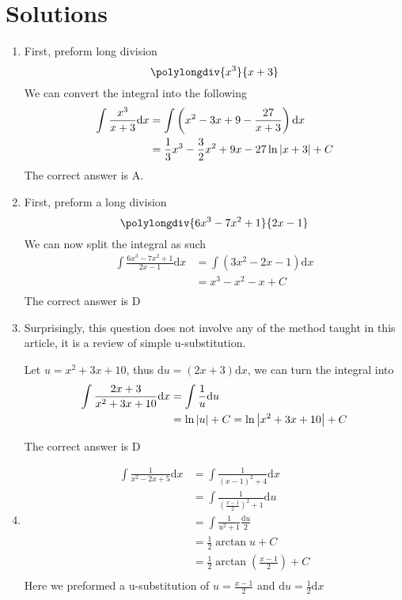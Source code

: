 \documentclass{article}
\numberwithin{equation}{section}
\begin{document}
\section{Solutions}
\begin{enumerate}
    \item First, preform long division
    \[
    \polylongdiv{x^3}{x+3}
    \]
    We can convert the integral into the following
    \begin{align*}
        \int \frac{x^3}{x+3}\mathrm{d}x &= \int \left(x^2 - 3x + 9 - \frac{27}{x+3}\right) \mathrm{d}x\\
        &= \frac{1}{3}x^3 - \frac{3}{2} x^2 + 9x - 27\ln{\abs{x+3}} + C\\
    \end{align*}
    The correct answer is A.
    \item First, preform a long division
    \[
    \polylongdiv{6x^3-7x^2+1}{2x-1}
    \]
    We can now split the integral as such
    \begin{align*}
        \int \frac{6x^3-7x^2+1}{2x-1}\mathrm{d}x &= \int \left(3x^2-2x-1\right) \mathrm{d}x\\
        &= x^3 - x^2 - x + C\\
    \end{align*}
    The correct answer is D
    \item Surprisingly, this question does not involve any of the method taught in this article, it is a review of simple u-substitution.
    
    Let $u = x^2 + 3x + 10$, thus $\mathrm{d}u = (2x+3)\mathrm{d}x$, we can turn the integral into
    \begin{align*}
        \int \frac{2x+3}{x^2 + 3x + 10}\mathrm{d}x &= \int \frac{1}{u}\mathrm{d}u\\
        &= \ln \abs{u} + C = \ln \abs{x^2+3x+10}+C
    \end{align*}

    The correct answer is D
    \item \begin{align*}
        \int \frac{1}{x^2-2x+5}\mathrm{d}x &= \int \frac{1}{(x-1)^2 + 4}\mathrm{d}x\\
        &= \int \frac{1}{\left(\frac{x-1}{2}\right)^2+1} \mathrm{d}u\\
        &= \int \frac{1}{u^2 + 1}\frac{\mathrm{d}u}{2}\\
        &=\frac{1}{2}\arctan u + C \\
        &= \frac{1}{2}\arctan \left(\frac{x-1}{2}\right) + C\\
    \end{align*}
    Here we preformed a u-substitution of $u = \frac{x-1}{2}$ and $\mathrm{d}u = \frac{1}{2}\mathrm{d}x$


\end{enumerate}
\end{document}
